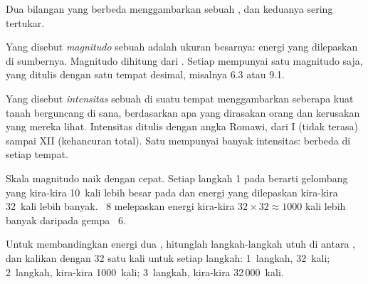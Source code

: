 Dua bilangan yang berbeda menggambarkan sebuah , dan keduanya sering tertukar.

\begin{definition}[Magnitudo]\label{def:g7:earthquakes:magnitude}
Yang disebut \emph{magnitudo} sebuah  adalah
ukuran besarnya: energi yang dilepaskan di sumbernya. Magnitudo dihitung
dari . Setiap  mempunyai satu magnitudo saja, yang
ditulis dengan satu tempat desimal, misalnya 6.3 atau 9.1.
\end{definition}

\begin{definition}[Intensitas]\label{def:g7:earthquakes:intensity}
Yang disebut \emph{intensitas} sebuah  di suatu
tempat menggambarkan seberapa kuat tanah berguncang di sana, berdasarkan apa
yang dirasakan orang dan kerusakan yang mereka lihat. Intensitas ditulis
dengan angka Romawi, dari I (tidak terasa) sampai XII (kehancuran total).
Satu  mempunyai banyak intensitas: berbeda di setiap tempat.
\end{definition}

Skala magnitudo naik dengan cepat. Setiap langkah 1 pada  berarti
gelombang yang kira-kira 10~kali lebih besar pada  dan energi
yang dilepaskan kira-kira 32~kali lebih banyak.  ~8
melepaskan energi kira-kira $32 \times 32 \approx 1000$ kali lebih banyak
daripada gempa ~6.

\begin{method}\label{met:g7:earthquakes:magnitudes}
Untuk membandingkan energi dua , hitunglah langkah-langkah utuh
di antara , dan kalikan dengan 32 satu kali untuk setiap
langkah: 1~langkah, 32~kali; 2~langkah, kira-kira 1000~kali; 3~langkah,
kira-kira 32\,000~kali.
\end{method}

